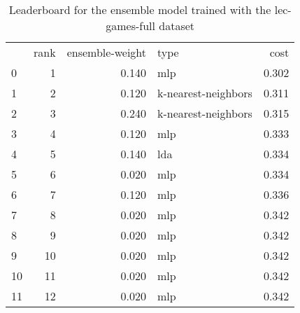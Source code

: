 \begin{table}[]
	\centering
	\begin{tabular}{lrrlr}
		   & rank & ensemble-weight & type                & cost  \\
		0  & 1    & 0.140           & mlp                 & 0.302 \\
		1  & 2    & 0.120           & k-nearest-neighbors & 0.311 \\
		2  & 3    & 0.240           & k-nearest-neighbors & 0.315 \\
		3  & 4    & 0.120           & mlp                 & 0.333 \\
		4  & 5    & 0.140           & lda                 & 0.334 \\
		5  & 6    & 0.020           & mlp                 & 0.334 \\
		6  & 7    & 0.120           & mlp                 & 0.336 \\
		7  & 8    & 0.020           & mlp                 & 0.342 \\
		8  & 9    & 0.020           & mlp                 & 0.342 \\
		9  & 10   & 0.020           & mlp                 & 0.342 \\
		10 & 11   & 0.020           & mlp                 & 0.342 \\
		11 & 12   & 0.020           & mlp                 & 0.342 \\
	\end{tabular}

	\caption{Leaderboard for the ensemble model trained with the lec-games-full dataset}
	\label{tab:lb-lec-games-full-autoencode}
\end{table}

